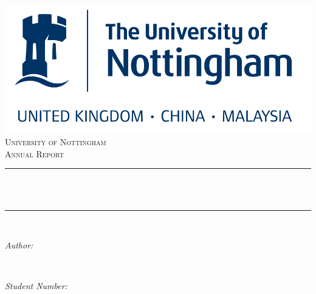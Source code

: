 \documentclass[12pt]{article}
\title{
}
\author{
}
\date{
}
\makeatletter
\let\thetitle\@title
\let\theauthor\@author
\let\thedate\@date
\makeatother
\begin{document}

\begin{titlepage}
	\centering
    \vspace*{0.5 cm}
    \includegraphics{uon.png}\\[1.0 cm]	%
    \textsc{\LARGE University of Nottingham}\\[2.0 cm]	%
	\textsc{\Large Annual Report}\\[0.5 cm]				%
	\rule{\linewidth}{0.2 mm} \\[0.4 cm]
	{ \huge \bfseries \thetitle}\\
	\rule{\linewidth}{0.2 mm} \\[1.5 cm]
	
	\begin{minipage}{0.4\textwidth}
		\begin{flushleft} \large
			\emph{Author:}\\
			\theauthor
			\end{flushleft}
			\end{minipage}~
			\begin{minipage}{0.4\textwidth}
			\begin{flushright} \large
			\emph{Student Number:} \\
		\end{flushright}
	\end{minipage}\\[2 cm]
	
	{\large \thedate}\\[2 cm]
 
	\vfill
	
\end{titlepage}


\tableofcontents
\pagebreak







\end{document}
